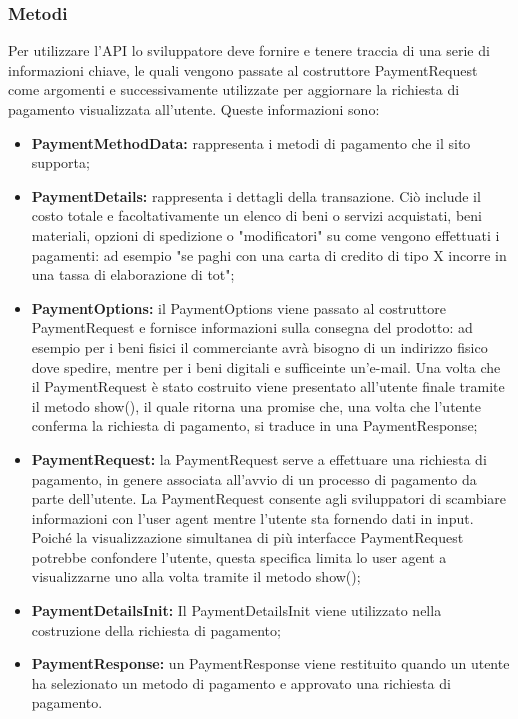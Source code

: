 \documentclass[11pt ,a4paper , twoside , openright ]{article}
\begin{document}
\subsubsection{Metodi}
Per utilizzare l'API lo sviluppatore deve fornire e tenere traccia di una serie di informazioni chiave, le quali vengono passate al costruttore PaymentRequest come argomenti e successivamente utilizzate per aggiornare la richiesta di pagamento visualizzata all'utente. Queste informazioni sono:
\begin{itemize}
	\item \textbf{PaymentMethodData:} rappresenta i metodi di pagamento che il sito supporta;
	\item \textbf{PaymentDetails:} rappresenta i dettagli della transazione. Ciò include il costo totale e facoltativamente un elenco di beni o servizi acquistati, beni materiali, opzioni di spedizione o "modificatori" su come vengono effettuati i pagamenti: ad esempio "se paghi con una carta di credito di tipo X incorre in una tassa di elaborazione di tot";
	\item \textbf{PaymentOptions:} il PaymentOptions viene passato al costruttore PaymentRequest e fornisce informazioni sulla consegna del prodotto: ad esempio per i beni fisici il commerciante avrà bisogno di un indirizzo fisico dove spedire, mentre per i beni digitali e sufficeinte un'e-mail. Una volta che il PaymentRequest è stato costruito viene presentato all'utente finale tramite il metodo show(), il quale ritorna una promise che, una volta che l'utente conferma la richiesta di pagamento, si traduce in una PaymentResponse;
	\item \textbf{PaymentRequest:} la PaymentRequest serve a effettuare una richiesta di pagamento, in genere associata all'avvio di un processo di pagamento da parte dell'utente. La PaymentRequest consente agli sviluppatori di scambiare informazioni con l'user agent mentre l'utente sta fornendo dati in input. Poiché la visualizzazione simultanea di più interfacce PaymentRequest potrebbe confondere l'utente, questa specifica limita lo user agent a visualizzarne uno alla volta tramite il metodo show();
	\item \textbf{PaymentDetailsInit:} Il PaymentDetailsInit viene utilizzato nella costruzione della richiesta di pagamento;
	\item \textbf{PaymentResponse:} un PaymentResponse viene restituito quando un utente ha selezionato un metodo di pagamento e approvato una richiesta di pagamento.
\end{itemize}
\end{document}
